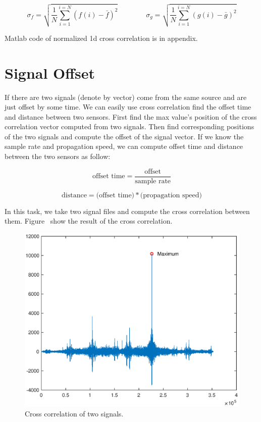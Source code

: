 \begin{equation*}
{\sigma _{f}}=
\sqrt{\frac{1}{N}\sum_{i=1}^{i=N}(f(i)-\bar{f})^{2}}
\hspace{4em}
{\sigma _{g}}=
\sqrt{\frac{1}{N}\sum_{i=1}^{i=N}(g(i)-\bar{g})^{2}}
\end{equation*}

Matlab code of normalized 1d cross correlation is in appendix.


\section{Signal Offset}

If there are two signals (denote by vector) come from the same source and are just offset by some time. We can easily use cross correlation find the offset time and distance between two sensors. First find the max value's position of the cross correlation vector computed from two signals. Then find corresponding positions of the two signals and compute the offset of the signal vector. If we know the sample rate and propagation speed, we can compute offset time and distance between the two sensors as follow:

\begin{equation*}
\text{offset time}=\frac{\text{offset}}{\text{sample rate}} 
\end{equation*}

\begin{equation*}
\text{distance}=\text{(offset time)} * \text{(propagation speed)}
\end{equation*}

In this task, we take two signal files and compute the cross correlation between them. Figure \ show the result of the cross correlation.

\begin{figure}[h!]
	\centering
		\includegraphics[width=0.50\linewidth]{figures/part1/crr_vis0.eps}
		\caption{Cross correlation of two signals.}
		\label{fig:crr_vis0}
\end{figure} 

